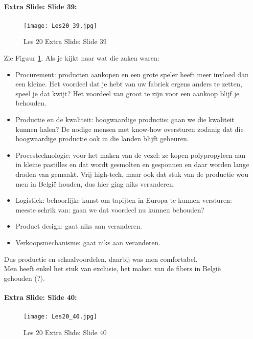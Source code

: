 \documentclass[10pt,a4paper]{report}
\begin{document}
\paragraph{Extra Slide: Slide 39:}

\begin{figure}[h!]
\centering
\texttt{[image: Les20\_39.jpg]}
\caption{Les 20 Extra Slide: Slide 39} 
\label{les20_39}
\end{figure}

Zie Figuur \ref{les20_39}. Als je kijkt naar wat die zaken waren:
\begin{itemize}
\item Procurement: producten aankopen en een grote speler heeft meer invloed dan een kleine. Het voordeel dat je hebt van uw fabriek ergens anders te zetten, speel je dat kwijt? Het voordeel van groot te zijn voor een aankoop blijf je behouden.
\item Productie en de kwaliteit: hoogwaardige productie: gaan we die kwaliteit kunnen halen? De nodige mensen met know-how oversturen zodanig dat die hoogwaardige productie ook in die landen blijft gebeuren. 
\item Procestechnologie: voor het maken van de vezel: ze kopen polypropyleen aan in kleine pastilles en dat wordt gesmolten en gesponnen en daar worden lange draden van gemaakt. Vrij high-tech, maar ook dat stuk van de productie wou men in Belgi\"e houden, dus hier ging niks veranderen.
\item Logistiek: behoorlijke kunst om tapijten in Europa te kunnen versturen: meeste schrik van: gaan we dat voordeel nu kunnen behouden?
\item Product design: gaat niks aan veranderen.
\item Verkoopsmechanisme: gaat niks aan veranderen.
\end{itemize}
Dus productie en schaalvoordelen, daarbij was men comfortabel.\\
Men heeft enkel het stuk van exclusie, het maken van de fibers in Belgi\"e gehouden (?).

\paragraph{Extra Slide: Slide 40:}

\begin{figure}[h!]
\centering
\texttt{[image: Les20\_40.jpg]}
\caption{Les 20 Extra Slide: Slide 40} 
\label{les20_40}
\end{figure}
\end{document}
